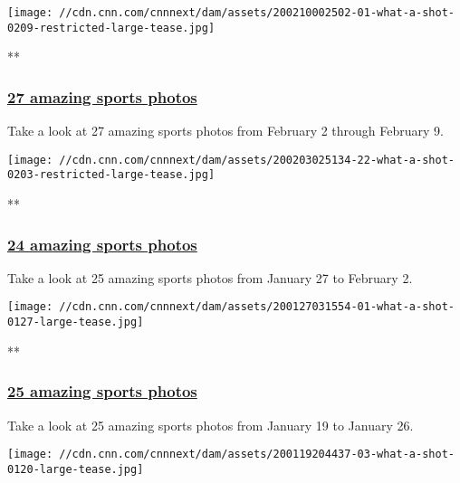\texttt{[image: //cdn.cnn.com/cnnnext/dam/assets/200210002502-01-what-a-shot-0209-restricted-large-tease.jpg]}

**

\hypertarget{27-amazing-sports-photos-1}{%
\subsubsection{\texorpdfstring{\href{/2020/02/10/sport/gallery/what-a-shot-0209/index.html}{27
amazing sports
photos}}{27 amazing sports photos}}\label{27-amazing-sports-photos-1}}

Take a look at 27 amazing sports photos from February 2 through February
9.

\href{/2020/02/03/sport/gallery/what-a-shot-0203/index.html}{}

\texttt{[image: //cdn.cnn.com/cnnnext/dam/assets/200203025134-22-what-a-shot-0203-restricted-large-tease.jpg]}

**

\hypertarget{24-amazing-sports-photos-1}{%
\subsubsection{\texorpdfstring{\href{/2020/02/03/sport/gallery/what-a-shot-0203/index.html}{24
amazing sports
photos}}{24 amazing sports photos}}\label{24-amazing-sports-photos-1}}

Take a look at 25 amazing sports photos from January 27 to February 2.

\href{/2020/01/27/sport/gallery/what-a-shot-0127/index.html}{}

\texttt{[image: //cdn.cnn.com/cnnnext/dam/assets/200127031554-01-what-a-shot-0127-large-tease.jpg]}

**

\hypertarget{25-amazing-sports-photos}{%
\subsubsection{\texorpdfstring{\href{/2020/01/27/sport/gallery/what-a-shot-0127/index.html}{25
amazing sports
photos}}{25 amazing sports photos}}\label{25-amazing-sports-photos}}

Take a look at 25 amazing sports photos from January 19 to January 26.

\href{/2020/01/20/sport/gallery/what-a-shot-0120/index.html}{}

\texttt{[image: //cdn.cnn.com/cnnnext/dam/assets/200119204437-03-what-a-shot-0120-large-tease.jpg]}


